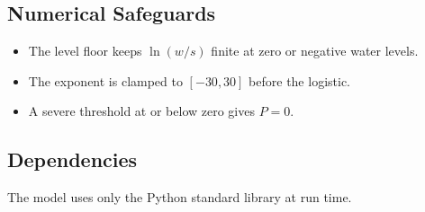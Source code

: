 \documentclass[11pt,a4paper]{article}
\begin{document}
\subsection{Numerical Safeguards}
\begin{itemize}[nosep]
    \item The level floor keeps $\ln(w/s)$ finite at zero or negative water levels.
    \item The exponent is clamped to $[-30, 30]$ before the logistic.
    \item A severe threshold at or below zero gives $P = 0$.
\end{itemize}

\subsection{Dependencies}
The model uses only the Python standard library at run time.

\mkmsensitivity
\end{document}
